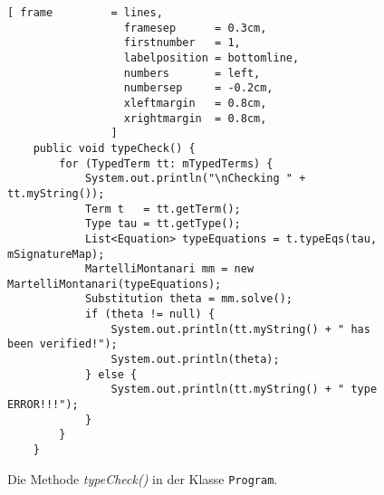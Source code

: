 \begin{figure}[!ht]
\centering
\begin{Verbatim}[ frame         = lines, 
                  framesep      = 0.3cm, 
                  firstnumber   = 1,
                  labelposition = bottomline,
                  numbers       = left,
                  numbersep     = -0.2cm,
                  xleftmargin   = 0.8cm,
                  xrightmargin  = 0.8cm,
                ]
    public void typeCheck() {
        for (TypedTerm tt: mTypedTerms) {
            System.out.println("\nChecking " + tt.myString());
            Term t   = tt.getTerm();
            Type tau = tt.getType();
            List<Equation> typeEquations = t.typeEqs(tau, mSignatureMap);
            MartelliMontanari mm = new MartelliMontanari(typeEquations);
            Substitution theta = mm.solve();
            if (theta != null) {
                System.out.println(tt.myString() + " has been verified!");
                System.out.println(theta);
            } else {
                System.out.println(tt.myString() + " type ERROR!!!");
            }
        }
    }
\end{Verbatim}
\vspace*{-0.3cm}
\caption{Die Methode \textsl{typeCheck()} in der Klasse \texttt{Program}.}
\label{fig:Program.typeCheck}
\end{figure}


